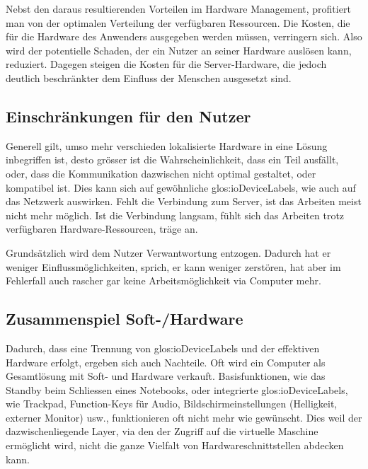 Nebst den daraus resultierenden Vorteilen im Hardware Management, profitiert man von der optimalen Verteilung der verfügbaren Ressourcen.
Die Kosten, die für die Hardware des Anwenders ausgegeben werden müssen, verringern sich.
Also wird der potentielle Schaden, der ein Nutzer an seiner Hardware auslösen kann, reduziert.
Dagegen steigen die Kosten für die Server-Hardware, die jedoch deutlich beschränkter dem Einfluss der Menschen ausgesetzt sind.

\subsection{Einschränkungen für den Nutzer}
Generell gilt, umso mehr verschieden lokalisierte Hardware in eine Lösung inbegriffen ist, desto grösser ist die Wahrscheinlichkeit, dass ein Teil ausfällt, oder, dass die Kommunikation dazwischen nicht optimal gestaltet, oder kompatibel ist.
Dies kann sich auf gewöhnliche \glspl{glos:ioDeviceLabel}, wie auch auf das Netzwerk auswirken.
Fehlt die Verbindung zum Server, ist das Arbeiten meist nicht mehr möglich.
Ist die Verbindung langsam, fühlt sich das Arbeiten trotz verfügbaren Hardware-Ressourcen, träge an.

Grundsätzlich wird dem Nutzer Verwantwortung entzogen. Dadurch hat er weniger Einflussmöglichkeiten, sprich, er kann weniger zerstören, hat aber im Fehlerfall auch rascher gar keine Arbeitsmöglichkeit via Computer mehr.

\subsection{Zusammenspiel Soft-/Hardware}
Dadurch, dass eine Trennung von \glspl{glos:ioDeviceLabel} und der effektiven Hardware erfolgt, ergeben sich auch Nachteile.
Oft wird ein Computer als Gesamtlösung mit Soft- und Hardware verkauft.
Basisfunktionen, wie das Standby beim Schliessen eines Notebooks, oder integrierte \glspl{glos:ioDeviceLabel}, wie Trackpad, Function-Keys für Audio, Bildschirmeinstellungen (Helligkeit, externer Monitor) usw., funktionieren oft nicht mehr wie gewünscht.
Dies weil der dazwischenliegende Layer, via den der Zugriff auf die virtuelle Maschine ermöglicht wird,  nicht die ganze Vielfalt von Hardwareschnittstellen abdecken kann.


